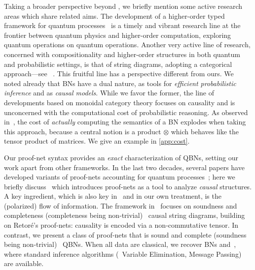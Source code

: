 Taking a broader perspective beyond \QBNs, we briefly mention some active research areas which share related aims. 
The development of a higher-order typed framework for quantum processes~\cite{10.1098/rspa.2018.0706,10.22331/q-2026-01-21-1978} is a timely and vibrant research line at the frontier between quantum physics and higher-order computation, exploring quantum operations on quantum operations.
Another very active line of research, concerned with compositionality and higher-order structures in both quantum and probabilistic settings, is that of string diagrams, adopting a categorical approach---see \eg~\cite{10.23638/LMCS-15(3:15)2019,10.4230/LIPIcs.MFCS.2022.80, simmons2024completelogiccausalconsistency}.
This fruitful line has a perspective different from ours.
We noted already that BNs have a dual nature, as tools for \emph{efficient probabilistic inference} and as \emph{causal models}.
While we favor the former, the line of developments based on monoidal category theory focuses on causality and is unconcerned with the computational cost of probabilistic reasoning.
As observed in~\cite[Example~9.7]{popl24}, the cost of \emph{actually} computing the semantics of a BN explodes when taking this approach, because a central notion is a product $\otimes$ which behaves like the tensor product of matrices.
We give an example in \cref{app:cost}. 

Our proof-net syntax provides an \emph{exact} characterization of QBNs, setting our work apart from other frameworks.
In the last two decades, several papers have developed variants of proof-nets accounting for quantum processes~\cite{DuncanThesis,AbramskyDuncan2009GeneralisedProofNets,esop2014,LagoFVY17,simmons2024completelogiccausalconsistency}; here we briefly discuss~\cite{simmons2024completelogiccausalconsistency} which introduces proof-nets as a tool to analyze \emph{causal} structures.
A key ingredient, which is also key in~\cite{popl24} and in our own treatment, is the (polarized) flow of information.
The framework in~\cite{simmons2024completelogiccausalconsistency} focuses on soundness and completeness (completeness being non‑trivial) \wrt\ causal string diagrams, building on Retoré’s proof-nets: causality is encoded via a non‑commutative tensor.
In contrast, we present a class of proof‑nets that is sound and complete (soundness being non‑trivial) \wrt\ QBNs.
When all data are classical, we recover BNs and~\cite{BPN}, where standard inference algorithms (\eg\ Variable Elimination, Message Passing) are available.


\appendix

